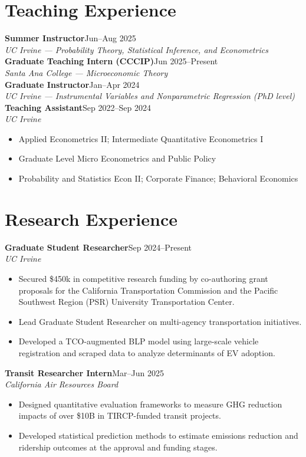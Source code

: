 \documentclass[11pt,letterpaper]{article}
\newcommand{\entry}[4]{
  \textbf{#1}\hfill #2\\
  \textit{#3}\hfill\textit{#4}\\[2pt]
}
\begin{document}
\section{Teaching Experience}
\entry{Summer Instructor}{Jun--Aug 2025}{UC Irvine --- Probability Theory, Statistical Inference, and Econometrics}{}
\entry{Graduate Teaching Intern (CCCIP)}{Jun 2025--Present}{Santa Ana College --- Microeconomic Theory}{}
\entry{Graduate Instructor}{Jan--Apr 2024}{UC Irvine --- Instrumental Variables and Nonparametric Regression (PhD level)}{}
\entry{Teaching Assistant}{Sep 2022--Sep 2024}{UC Irvine}{}
\begin{itemize}[nosep,leftmargin=1.5em]
  \item Applied Econometrics II; Intermediate Quantitative Econometrics I
  \item Graduate Level Micro Econometrics and Public Policy
  \item Probability and Statistics Econ II; Corporate Finance; Behavioral Economics
\end{itemize}
\vspace{4pt}

\section{Research Experience}
\entry{Graduate Student Researcher}{Sep 2024--Present}{UC Irvine}{}
\begin{itemize}[nosep,leftmargin=1.5em]
  \item Secured \$450k in competitive research funding by co-authoring grant proposals for the California Transportation Commission and the Pacific Southwest Region (PSR) University Transportation Center.
  \item Lead Graduate Student Researcher on multi-agency transportation initiatives.
  \item Developed a TCO-augmented BLP model using large-scale vehicle registration and scraped data to analyze determinants of EV adoption.
\end{itemize}
\vspace{4pt}

\entry{Transit Researcher Intern}{Mar--Jun 2025}{California Air Resources Board}{}
\begin{itemize}[nosep,leftmargin=1.5em]
  \item Designed quantitative evaluation frameworks to measure GHG reduction impacts of over \$10B in TIRCP-funded transit projects.
  \item Developed statistical prediction methods to estimate emissions reduction and ridership outcomes at the approval and funding stages.
\end{itemize}
\vspace{4pt}
\end{document}
